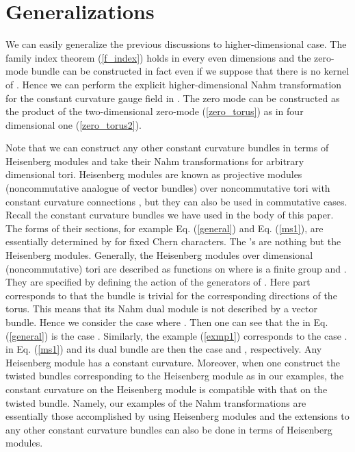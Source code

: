 \documentclass[a4paper,epsf,12pt]{article}
\providecommand{\R}{{\mathbb{R}}}
\providecommand{\Z}{{\mathbb{Z}}}
\providecommand{\cD}{{\cal D}}
\def \cD{{\cal D}}
\begin{document}
\section{Generalizations}


We can easily generalize the previous discussions to
higher-dimensional case.
The family index theorem (\ref{f_index}) holds in every even dimensions
and the zero-mode bundle can be constructed in fact even if we 
suppose that there is no kernel of \myHighlight{$\cD$}\coordHE{}.
Hence we can perform the explicit
higher-dimensional Nahm transformation for the constant
curvature gauge field in \cite{Taylor, Troost}.
The zero mode can be constructed as the product of the
two-dimensional zero-mode (\ref{zero_torus}) 
as in four dimensional one (\ref{zero_torus2}).

Note that we can construct any other constant curvature bundles 
in terms of Heisenberg modules \cite{KoSc} 
and take their Nahm transformations for arbitrary dimensional tori. 
Heisenberg modules are known as projective modules 
(noncommutative analogue of vector bundles) over noncommutative tori
with constant curvature connections
\cite{KoSc}, but they can also be used in commutative cases. 
Recall the constant curvature bundles we have used in the body 
of this paper. 
The forms of their sections, 
for example Eq. (\ref{general}) and Eq. (\ref{ms1}), are 
essentially determined by \coordHE{} for fixed Chern characters. 
The \coordHE{}'s are nothing but the Heisenberg modules. 
Generally,  
the Heisenberg modules over \coordHE{} dimensional (noncommutative) tori 
are described as functions on \myHighlight{$\R^d\times \Z^{d'}\times F$}\coordHE{} where 
\coordHE{} is a finite group and \coordHE{}. 
They are specified by defining the action of the generators of 
\coordHE{}. 
Here \myHighlight{$\Z^{d'}$}\coordHE{} part corresponds to that the bundle is trivial 
for the corresponding \coordHE{} directions of the torus. 
This means that its Nahm dual module is 
not described by a vector bundle. 
Hence we consider the case 
\myHighlight{$\R^d\times F$}\coordHE{} where \coordHE{}. 
Then one can see that the \coordHE{} in Eq. (\ref{general}) is the case 
\myHighlight{$d=1, F=\Z_k$}\coordHE{}. 
Similarly, the example (\ref{exmp1}) corresponds to the case 
\myHighlight{$d=2, F=\Z_k\times\Z_k$}\coordHE{}. 
\coordHE{} in Eq. (\ref{ms1}) and its dual bundle are then the case 
\coordHE{} and \myHighlight{$d=2, F=\Z_2$}\coordHE{}, respectively. 
Any Heisenberg module has a constant curvature. 
Moreover, when one construct the twisted bundles corresponding to the 
Heisenberg module as in our examples, 
the constant curvature on the Heisenberg module is compatible with 
that on the twisted bundle. 
Namely, our examples of the Nahm transformations are essentially 
those accomplished by using Heisenberg modules and 
the extensions to any other constant curvature bundles can also be 
done in terms of Heisenberg modules. 
\end{document}
